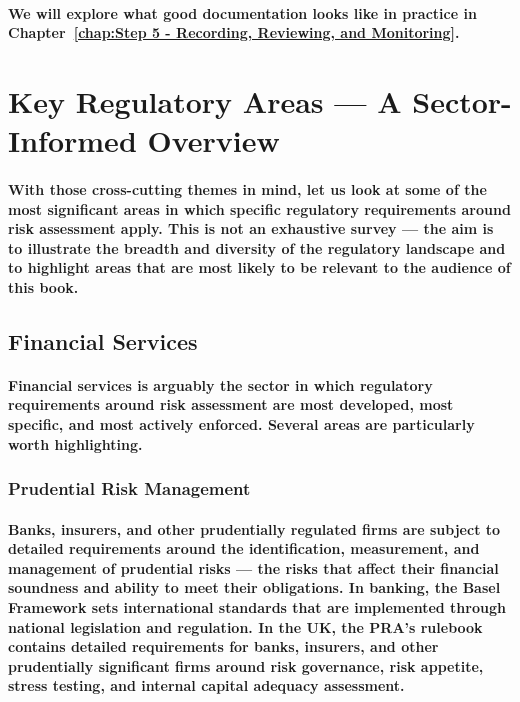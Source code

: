 \paragraph{We will explore what good documentation looks like in practice in Chapter~\ref{chap:Step 5 - Recording, Reviewing, and Monitoring}.}

\section{Key Regulatory Areas — A Sector-Informed Overview}
\paragraph{With those cross-cutting themes in mind, let us look at some of the most significant areas in which specific regulatory requirements around risk assessment apply. This is not an exhaustive survey — the aim is to illustrate the breadth and diversity of the regulatory landscape and to highlight areas that are most likely to be relevant to the audience of this book.}

\subsection{Financial Services}
\paragraph{Financial services is arguably the sector in which regulatory requirements around risk assessment are most developed, most specific, and most actively enforced. Several areas are particularly worth highlighting.}
\subsubsection{Prudential Risk Management}
\paragraph{Banks, insurers, and other prudentially regulated firms are subject to detailed requirements around the identification, measurement, and management of prudential risks — the risks that affect their financial soundness and ability to meet their obligations. In banking, the Basel Framework sets international standards that are implemented through national legislation and regulation. In the UK, the PRA's rulebook contains detailed requirements for banks, insurers, and other prudentially significant firms around risk governance, risk appetite, stress testing, and internal capital adequacy assessment.}
